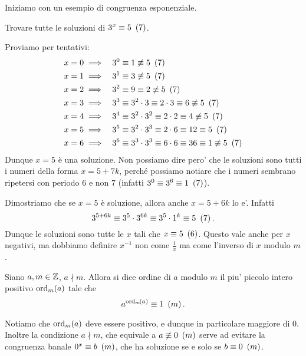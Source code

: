 Iniziamo con un esempio di congruenza esponenziale.
\begin{example}
    Trovare tutte le soluzioni di $3^x \equiv 5 \Mod{7}$.
\end{example}
\begin{solution}
    Proviamo per tentativi:
    \begin{alignat*}
        {2}
        &x = 0 \implies &&3^0 \equiv 1 \nequiv 5 \Mod{7}\\
        &x = 1 \implies &&3^1 \equiv 3 \nequiv 5 \Mod{7}\\
        &x = 2 \implies &&3^2 \equiv 9 \equiv 2 \nequiv 5 \Mod{7}\\
        &x = 3 \implies &&3^3 \equiv 3^2 \cdot 3 \equiv 2 \cdot 3 \equiv 6 \nequiv 5 \Mod{7}\\
        &x = 4 \implies &&3^4 \equiv 3^2 \cdot 3^2 \equiv 2 \cdot 2 \equiv 4 \nequiv 5 \Mod{7}\\
        &x = 5 \implies &&3^5 \equiv 3^2 \cdot 3^3 \equiv 2 \cdot 6 \equiv 12 \equiv 5 \Mod{7}\\
        &x = 6 \implies &&3^6 \equiv 3^3 \cdot 3^3 \equiv 6 \cdot 6 \equiv 36 \equiv 1 \nequiv 5 \Mod{7}
    \end{alignat*}
    Dunque $x = 5$ è una soluzione. Non possiamo dire pero' che le soluzioni sono tutti i numeri della forma $x = 5 + 7k$, perché possiamo notiare che i numeri sembrano ripetersi con periodo $6$ e non $7$ (infatti $3^0 \equiv 3^6 \equiv 1 \Mod{7}$). 

    Dimostriamo che se $x = 5$ è soluzione, allora anche $x = 5 +6k$ lo e'. Infatti \[
        3^{5 + 6k} \equiv 3^5 \cdot 3^{6k} \equiv 3^5 \cdot 1^k \equiv 5 \Mod{7}.
    \]
    Dunque le soluzioni sono tutte le $x$ tali che $x \equiv 5 \Mod{6}$. Questo vale anche per $x$ negativi, ma dobbiamo definire $x^{-1}$ non come $\frac{1}{x}$ ma come l'inverso di $x$ modulo $m$.
\end{solution}

\begin{definition}
    Siano $a, m \in \Z$, $a \nmid m$. Allora si dice ordine di $a$ modulo $m$ il piu' piccolo intero positivo $\ord{a}{m}$ tale che \begin{equation}
        a^{\ord{a}{m}} \equiv 1 \Mod{m}.
    \end{equation}
\end{definition}

\begin{remark}
    Notiamo che $\ord{a}{m}$ deve essere positivo, e dunque in particolare maggiore di $0$. Inoltre la condizione $a \nmid m$, che equivale a $a \nequiv 0 \Mod{m}$ serve ad evitare la congruenza banale $0^x \equiv b \Mod{m}$, che ha soluzione se e solo se $b \equiv 0 \Mod{m}$.
\end{remark}


